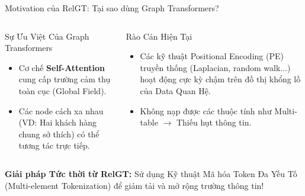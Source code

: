 \documentclass[aspectratio=169,11pt]{beamer}
\begin{document}
\begin{frame}{Motivation của RelGT: Tại sao dùng Graph Transformers?}
\begin{columns}[T]
\begin{exampleblock}{Sự Ưu Việt Của Graph Transformers}
\begin{itemize}
    \item Cơ chế \textbf{Self-Attention} cung cấp trường cảm thụ toàn cục (Global Field).
    \item Các node cách xa nhau (VD: Hai khách hàng chung sở thích) có thể tương tác trực tiếp.
\end{itemize}
\end{exampleblock}

\begin{alertblock}{Rào Cản Hiện Tại}
\begin{itemize}
    \item Các kỹ thuật Positional Encoding (PE) truyền thống (Laplacian, random walk...) hoạt động cực kỳ chậm trên đồ thị khổng lồ của Data Quan Hệ.
    \item Không nạp được các thuộc tính như Multi-table $\to$ Thiếu hụt thông tin.
\end{itemize}
\end{alertblock}
\end{columns}

\vspace{10pt}
\begin{center}
\color{hcmusblue}\textbf{Giải pháp Tức thời từ RelGT:} Sử dụng Kỹ thuật Mã hóa Token Đa Yếu Tố (Multi-element Tokenization) để giảm tải và mở rộng trường thông tin!
\end{center}
\end{frame}
\end{document}
